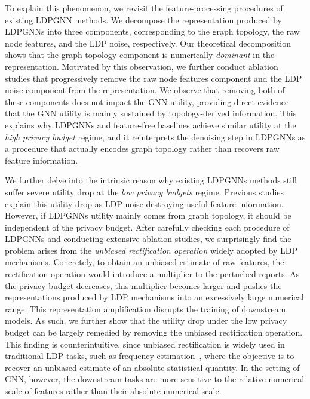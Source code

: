 \documentclass[conference,compsoc]{IEEEtran}
\theoremstyle{boldplain}
\theoremstyle{bolddefinition}
\theoremstyle{remark}
\newcommand{\ldpgnn}{LDPGNN\xspace}
\newcommand{\ldpgnns}{LDPGNNs\xspace}
\begin{document}
To explain this phenomenon, we revisit the feature-processing procedures of existing \ldpgnn methods.
We decompose the representation produced by \ldpgnns into three components, corresponding to the graph topology, the raw node features, and the LDP noise, respectively.
\textcolor{purple!80}{
Our theoretical decomposition shows that the graph topology component is numerically \textit{dominant} in the representation.
Motivated by this observation, we further conduct ablation studies that progressively remove the raw node features component and the LDP noise component from the representation.
We observe that removing both of these components does not impact the GNN utility, providing direct evidence that the GNN utility is mainly sustained by topology-derived information.
}
This explains why \ldpgnns and feature-free baselines achieve similar utility at the \textit{high privacy budget} regime, and it reinterprets the denoising step in \ldpgnns as a procedure that actually encodes graph topology rather than recovers raw feature information.










We further delve into the intrinsic reason why existing \ldpgnns methods still suffer severe utility drop at the \textit{low privacy budgets} regime.
Previous studies explain this utility drop as LDP noise destroying useful feature information.
However, if \ldpgnns utility mainly comes from graph topology, it should be independent of the privacy budget.
After carefully checking each procedure of \ldpgnns and conducting extensive ablation studies, we surprisingly find the problem arises from the \textit{unbiased rectification operation} widely adopted by LDP mechanisms.
Concretely, to obtain an unbiased estimate of raw features, the rectification operation would introduce a multiplier to the perturbed reports.
As the privacy budget decreases, this multiplier becomes larger and pushes the representations produced by LDP mechanisms into an excessively large numerical range.
This representation amplification disrupts the training of downstream models.
As such, we further show that the utility drop under the low privacy budget can be largely remedied by removing the unbiased rectification operation.
This finding is counterintuitive, since unbiased rectification is widely used in traditional LDP tasks, such as frequency estimation~\cite{wang2017locally}, where the objective is to recover an unbiased estimate of an absolute statistical quantity.
In the setting of GNN, however, the downstream tasks are more sensitive to the relative numerical scale of features rather than their absolute numerical scale.
\end{document}

